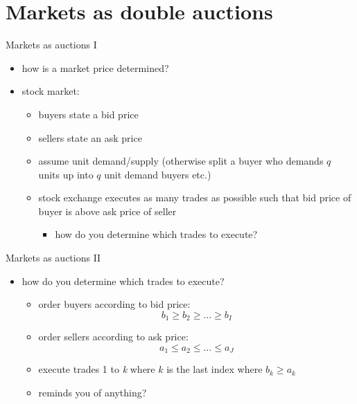 \documentclass[bigger]{beamer}
\begin{document}
\section{Markets as double auctions}
\label{sec:orgc3da72d}
\begin{frame}[label={sec:orgb3df2df}]{Markets as auctions I}
\begin{itemize}
\item how is a market price determined?
\item stock market:
\begin{itemize}
\item buyers state a bid price
\item sellers state an ask price
\item assume unit demand/supply (otherwise split a buyer who demands \(q\) units up into \(q\) unit demand buyers etc.)
\item stock exchange executes as many trades as possible such that bid price of buyer is above ask price of seller
\begin{itemize}
\item how do you determine which trades to execute?
\end{itemize}
\end{itemize}
\end{itemize}
\end{frame}

\begin{frame}[label={sec:org2ef8c57}]{Markets as auctions II}
\begin{itemize}
\item how do you determine which trades to execute?
\begin{itemize}
\item order buyers according to bid price:
$$b_1\geq b_2\geq\dots\geq b_I$$
\item order sellers according to ask price:
$$a_1\leq a_2\leq\dots\leq a_J$$
\item execute trades 1 to \emph{k} where \(k\) is the last index where \(b_k\geq a_k\)
\item reminds you of anything?
\end{itemize}
\end{itemize}
\end{frame}
\end{document}
